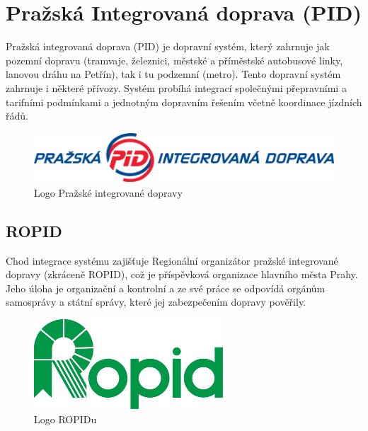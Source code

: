 \chapter{Pražská Integrovaná doprava (PID)}
\label{3-teorie-pid}

Pražská integrovaná doprava (PID) je dopravní systém, který zahrnuje jak pozemní
dopravu (tramvaje, železnici, městské a příměstské autobusové linky, lanovou dráhu na Petřín),
tak i tu podzemní (metro). Tento dopravní systém zahrnuje i některé přívozy. 
Systém probíhá integrací společnými přepravními a tarifními podmínkami a jednotným dopravním řešením včetně 
koordinace jízdních řádů. \cite{pid}
\vskip 0.2in
 
\begin{figure}[H] \centering
    \includegraphics[width=400pt]{./pictures/pid-logo.png}
    \caption[Logo Pražské integrované dopravy]{Logo Pražské integrované dopravy \cite{pid}}
	\label{fig:pid-logo}                                
\end{figure} 

\section{ROPID}

Chod integrace systému zajišťuje Regionální organizátor pražské integrované dopravy (zkráceně ROPID),
což je příspěvková organizace hlavního města Prahy. Jeho úloha je organizační a kontrolní
a ze své práce se odpovídá orgánům samosprávy a státní správy, které jej zabezpečením dopravy pověřily.

\begin{figure}[H] \centering
    \includegraphics[width=200pt]{./pictures/ropid-logo.jpg}
    \caption[Logo ROPIDu]{Logo ROPIDu \cite{pid}}
	\label{fig:ropid-logo}                                
\end{figure}

